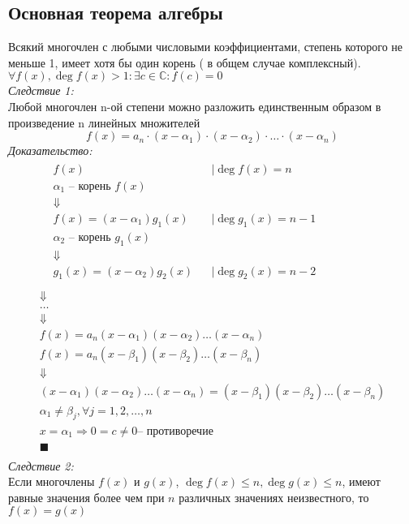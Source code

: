 \documentclass[12pt, fleqn]{article}
\begin{document}
\subsection*{Основная теорема алгебры}
Всякий многочлен с любыми числовыми коэффициентами, степень которого не меньше 1, имеет хотя бы один корень ( в общем случае комплексный).\\
$\forall f(x), \deg f(x) > 1: \exists c\in \mathbb{C} \colon f(c)=0$\\
\textit{Следствие 1:}\\
Любой многочлен n-ой степени можно разложить единственным образом в произведение n линейных множителей
$$f(x) = a_n\cdot\left(x-\alpha_1\right)\cdot\left(x-\alpha_2\right)\cdot\dots \cdot\left(x-\alpha_n\right)$$
\textit{Доказательство:}
\begin{align*}
	&\begin{aligned}
		&f(x) &&|\deg f(x)=n\\
		&\alpha_1 \text{ -- корень }f(x)&\\
		&\Downarrow\\
		&f(x)=\left(x-\alpha_1\right)g_1(x)&& |\deg g_1(x) = n-1&\\
		&\alpha_2 \text{ -- корень }g_1(x)&\\
		&\Downarrow\\
		&g_1(x)=\left(x-\alpha_2\right)g_2(x)&& |\deg g_2(x) = n-2&\\
	\end{aligned}\\
	&\Downarrow\\
	&\dots \\
	&\Downarrow\\
	&f(x)=a_n\left(x-\alpha_1\right)\left(x-\alpha_2\right)\dots \left(x-\alpha_n\right)&\\
	&f(x)=a_n\left(x-\beta_1\right)\left(x-\beta_2\right)\dots \left(x-\beta_n\right)&\\
	&\Downarrow\\
	&\left(x-\alpha_1\right)\left(x-\alpha_2\right)\dots \left(x-\alpha_n\right)=\left(x-\beta_1\right)\left(x-\beta_2\right)\dots \left(x-\beta_n\right)&\\
	&\alpha_1\neq\beta_j, \forall j = 1,2,\dots ,n\\
	&x=\alpha_1 \Rightarrow 0 = c \neq 0 \text{-- противоречие}\\
	&\blacksquare\\
\end{align*}
\textit{Следствие 2:}\\
Если многочлены $f(x)$ и $g(x)$, $\deg f(x) \leq n, \deg g(x) \leq n$, имеют равные значения более чем при $n$ различных значениях неизвестного, то $f(x) = g(x)$\\
\end{document}
